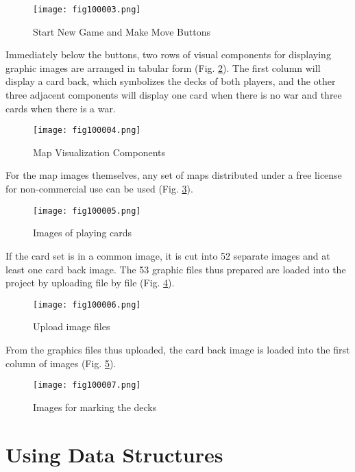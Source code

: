 \begin{figure}[H]
   \centering
   \texttt{[image: fig100003.png]}
   \caption{Start New Game and Make Move Buttons}
\label{fig100003}
\end{figure}

Immediately below the buttons, two rows of visual components for displaying graphic images are arranged in tabular form (Fig. \ref{fig100004}). The first column will display a card back, which symbolizes the decks of both players, and the other three adjacent components will display one card when there is no war and three cards when there is a war.

\begin{figure}[H]
   \centering
   \texttt{[image: fig100004.png]}
   \caption{Map Visualization Components}
\label{fig100004}
\end{figure}

For the map images themselves, any set of maps distributed under a free license for non-commercial use can be used (Fig. \ref{fig100005}).

\begin{figure}[H]
   \centering
   \texttt{[image: fig100005.png]}
   \caption{Images of playing cards}
\label{fig100005}
\end{figure}

If the card set is in a common image, it is cut into 52 separate images and at least one card back image. The 53 graphic files thus prepared are loaded into the project by uploading file by file (Fig. \ref{fig100006}).

\begin{figure}[H]
   \centering
   \texttt{[image: fig100006.png]}
   \caption{Upload image files}
\label{fig100006}
\end{figure}

From the graphics files thus uploaded, the card back image is loaded into the first column of images (Fig. \ref{fig100007}).

\begin{figure}[H]
   \centering
   \texttt{[image: fig100007.png]}
   \caption{Images for marking the decks}
\label{fig100007}
\end{figure}

\section{Using Data Structures}

